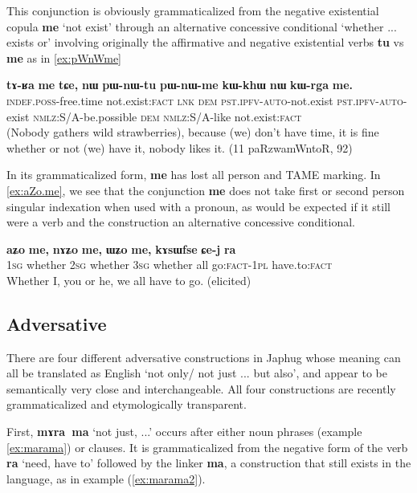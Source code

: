 \documentclass[oldfontcommands,oneside,a4paper,11pt]{article}
\newcommand{\ipa}[1]{\mbox{\phon\textbf{#1}}} %
\begin{document}
This conjunction is obviously grammaticalized from the negative existential copula \ipa{me} `not exist' through an alternative  concessive conditional `whether ... exists or' involving originally the affirmative and negative existential verbs \ipa{tu} vs \ipa{me} as in \ref{ex:pWnWme}

\begin{exe}
\ex \label{ex:pWnWme}
\gll \ipa{tɤ-ʁa} 	\ipa{me} 	\ipa{tɕe,} 	\ipa{nɯ} 	\ipa{pɯ-nɯ-tu} 	\ipa{pɯ-nɯ-me} 	\ipa{kɯ-khɯ} 	\ipa{nɯ} 	\ipa{kɯ-rga} 	\ipa{me.} \\
\textsc{indef.poss}-free.time not.exist:\textsc{fact} \textsc{lnk} \textsc{dem} \textsc{pst.ipfv-auto}-not.exist \textsc{pst.ipfv-auto}-exist \textsc{nmlz}:S/A-be.possible \textsc{dem} \textsc{nmlz}:S/A-like not.exist:\textsc{fact} \\
\glt (Nobody gathers wild strawberries), because (we) don't have time, it is fine whether or not (we) have it, nobody likes it. (11 paRzwamWntoR, 92)
\end{exe}
 
 In its grammaticalized form, \ipa{me} has lost all person and TAME marking.  In \ref{ex:aZo.me}, we see that the conjunction \ipa{me} does not take first or second person singular indexation when used with a pronoun, as would be expected if it still were a verb and the construction an alternative  concessive conditional.
 
 \begin{exe}
\ex \label{ex:aZo.me}
\gll 
 \ipa{aʑo} 	\ipa{me,} 	\ipa{nɤʑo} 	\ipa{me,} 	\ipa{ɯʑo} 	\ipa{me,} 	\ipa{kɤsɯfse} 	\ipa{ɕe-j} 	\ipa{ra} \\
\textsc{1sg} whether \textsc{2sg} whether \textsc{3sg} whether all go:\textsc{fact}-\textsc{1pl} have.to:\textsc{fact} \\
\glt Whether I, you or he, we all have to go. (elicited)
\end{exe}


\subsection{Adversative}
There are four different  adversative constructions in Japhug whose meaning can all be translated as English  `not only/ not just ... but also', and appear to be semantically very close and interchangeable. All four constructions are recently grammaticalized and etymologically transparent.

First, \ipa{mɤra ma} `not just, ...'  occurs after either noun phrases (example  \ref{ex:marama}) or clauses. It is grammaticalized from the negative form of the verb \ipa{ra} `need, have to' followed by the linker \ipa{ma}, a construction that still exists in the language, as in example (\ref{ex:marama2}).
\end{document}
